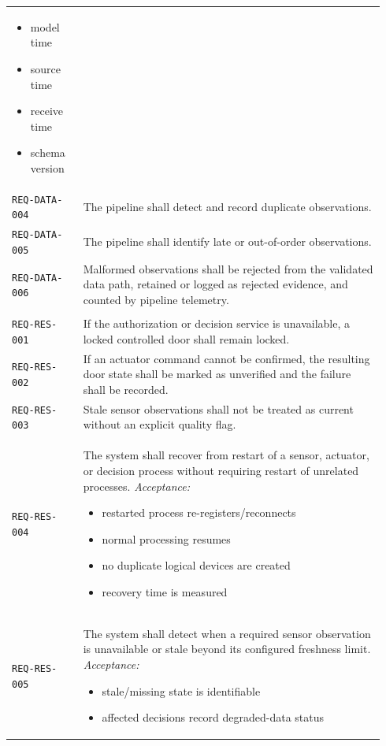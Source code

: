 \documentclass[11pt]{article}
\providecommand{\tightlist}{\setlength{\itemsep}{0pt}\setlength{\parskip}{0pt}}
\begin{document}
\begin{longtable}[]{@{}
>{\raggedright\arraybackslash}p{0.18\linewidth}
>{\raggedright\arraybackslash}p{0.76\linewidth}@{}}
\begin{itemize}
\item model time
\item source time
\item receive time
\item schema version
\end{itemize} \\
\addlinespace[3pt]
\texttt{REQ-DATA-004} & The pipeline shall detect and record duplicate observations. \\
\addlinespace[3pt]
\texttt{REQ-DATA-005} & The pipeline shall identify late or out-of-order observations. \\
\addlinespace[3pt]
\texttt{REQ-DATA-006} & Malformed observations shall be rejected from the validated data path, retained or logged as rejected evidence, and counted by pipeline telemetry. \\
\addlinespace[3pt]
\multicolumn{2}{@{}l}{\textbf{Resilience requirements}} \\[2pt]
\texttt{REQ-RES-001} & If the authorization or decision service is unavailable, a locked controlled door shall remain locked. \\
\addlinespace[3pt]
\texttt{REQ-RES-002} & If an actuator command cannot be confirmed, the resulting door state shall be marked as unverified and the failure shall be recorded. \\
\addlinespace[3pt]
\texttt{REQ-RES-003} & Stale sensor observations shall not be treated as current without an explicit quality flag. \\
\addlinespace[3pt]
\texttt{REQ-RES-004} & The system shall recover from restart of a sensor, actuator, or decision process without requiring restart of unrelated processes.
\textit{Acceptance:}
\begin{itemize}\tightlist
\item restarted process re-registers/reconnects
\item normal processing resumes
\item no duplicate logical devices are created
\item recovery time is measured
\end{itemize} \\
\addlinespace[3pt]
\texttt{REQ-RES-005} & The system shall detect when a required sensor observation is unavailable or stale beyond its configured freshness limit.
\textit{Acceptance:}
\begin{itemize}\tightlist
\item stale/missing state is identifiable
\item affected decisions record degraded-data status

\end{itemize}
\end{longtable}
\end{document}
